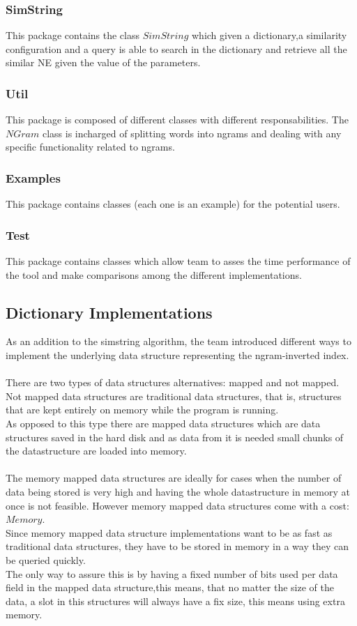 \subsubsection*{SimString}
This package contains the class $SimString$ which given a dictionary,a similarity configuration  and a query
is able to search in the dictionary and retrieve all the similar NE given the value of the parameters.


\subsubsection*{Util}
This package is composed of different classes with different responsabilities.
The $NGram$ class is incharged of splitting words into ngrams and dealing with any specific functionality related to ngrams.

\subsubsection*{Examples}
This package contains classes (each one is an example) for the potential users.

\subsubsection*{Test}
This package contains classes which allow team to asses the time performance of the tool and make comparisons among the different implementations.


\subsection{Dictionary Implementations}

As an addition to the simstring algorithm, the team introduced different ways to implement
the underlying data structure representing the ngram-inverted index.\\
\\
There are two types of data structures alternatives: mapped and not mapped.
Not mapped data structures are traditional data structures, that is, structures that are kept entirely on memory while the program is running. \\
As opposed to this type  there are mapped data structures which are data structures saved in the hard disk
and as data from it is needed small chunks of the datastructure are loaded into memory.\\
\\
The memory mapped data structures are ideally for cases when the number of data being stored is very high and having the whole datastructure in memory at once is not feasible.
However memory mapped data structures come with a cost: $Memory$.\\
Since memory mapped data structure implementations want to be as fast as traditional data structures, they have to be stored in memory in a way they can be queried quickly.\\
The only way to assure this is by having a fixed number of bits used per data field in the mapped data structure,this means, that no matter the size of the data, a slot in this structures will always have a fix size, this means using extra memory.


